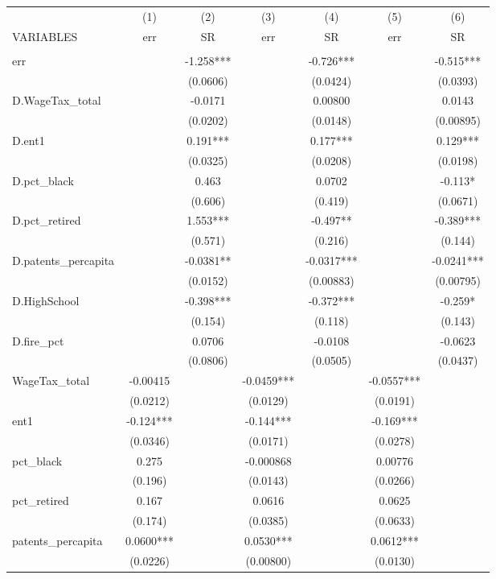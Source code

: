 \begin{tabular}{lcccccc} \hline
 & (1) & (2) & (3) & (4) & (5) & (6) \\
VARIABLES & err & SR & err & SR & err & SR \\ \hline
 &  &  &  &  &  &  \\
err &  & -1.258*** &  & -0.726*** &  & -0.515*** \\
 &  & (0.0606) &  & (0.0424) &  & (0.0393) \\
D.WageTax\_total &  & -0.0171 &  & 0.00800 &  & 0.0143 \\
 &  & (0.0202) &  & (0.0148) &  & (0.00895) \\
D.ent1 &  & 0.191*** &  & 0.177*** &  & 0.129*** \\
 &  & (0.0325) &  & (0.0208) &  & (0.0198) \\
D.pct\_black &  & 0.463 &  & 0.0702 &  & -0.113* \\
 &  & (0.606) &  & (0.419) &  & (0.0671) \\
D.pct\_retired &  & 1.553*** &  & -0.497** &  & -0.389*** \\
 &  & (0.571) &  & (0.216) &  & (0.144) \\
D.patents\_percapita &  & -0.0381** &  & -0.0317*** &  & -0.0241*** \\
 &  & (0.0152) &  & (0.00883) &  & (0.00795) \\
D.HighSchool &  & -0.398*** &  & -0.372*** &  & -0.259* \\
 &  & (0.154) &  & (0.118) &  & (0.143) \\
D.fire\_pct &  & 0.0706 &  & -0.0108 &  & -0.0623 \\
 &  & (0.0806) &  & (0.0505) &  & (0.0437) \\
WageTax\_total & -0.00415 &  & -0.0459*** &  & -0.0557*** &  \\
 & (0.0212) &  & (0.0129) &  & (0.0191) &  \\
ent1 & -0.124*** &  & -0.144*** &  & -0.169*** &  \\
 & (0.0346) &  & (0.0171) &  & (0.0278) &  \\
pct\_black & 0.275 &  & -0.000868 &  & 0.00776 &  \\
 & (0.196) &  & (0.0143) &  & (0.0266) &  \\
pct\_retired & 0.167 &  & 0.0616 &  & 0.0625 &  \\
 & (0.174) &  & (0.0385) &  & (0.0633) &  \\
patents\_percapita & 0.0600*** &  & 0.0530*** &  & 0.0612*** &  \\
 & (0.0226) &  & (0.00800) &  & (0.0130) &  \\

\end{tabular}
